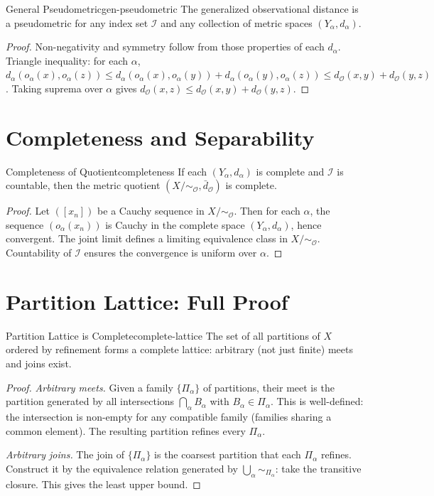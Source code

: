 \documentclass[12pt,twoside,openright]{book}
\newcommand{\obs}{\mathcal{O}}
\newcommand{\distMetric}{d_{\mathcal{O}}}
\providecommand{\quotientObs}{X/{\sim_{\obs}}}
\begin{document}
\begin{theorem}{General Pseudometric}{gen-pseudometric}
The generalized observational distance is a pseudometric for
any index set $\mathcal{I}$ and any collection of metric
spaces $(Y_\alpha,d_\alpha)$.
\begin{proof}
Non-negativity and symmetry follow from those properties of
each $d_\alpha$. Triangle inequality: for each $\alpha$,
$d_\alpha(o_\alpha(x),o_\alpha(z))\le d_\alpha(o_\alpha(x),
o_\alpha(y))+d_\alpha(o_\alpha(y),o_\alpha(z))\le
\distMetric(x,y)+\distMetric(y,z)$. Taking suprema over
$\alpha$ gives $\distMetric(x,z)\le\distMetric(x,y)+
\distMetric(y,z)$.
\end{proof}
\end{theorem}

\section{Completeness and Separability}

\begin{theorem}{Completeness of Quotient}{completeness}
If each $(Y_\alpha,d_\alpha)$ is complete and $\mathcal{I}$
is countable, then the metric quotient $(\quotientObs,
\bar{d}_\obs)$ is complete.
\begin{proof}
Let $([x_n])$ be a Cauchy sequence in $\quotientObs$. Then
for each $\alpha$, the sequence $(o_\alpha(x_n))$ is Cauchy
in the complete space $(Y_\alpha,d_\alpha)$, hence convergent.
The joint limit defines a limiting equivalence class in
$\quotientObs$. Countability of $\mathcal{I}$ ensures the
convergence is uniform over $\alpha$.
\end{proof}
\end{theorem}

\section{Partition Lattice: Full Proof}

\begin{theorem}{Partition Lattice is Complete}{complete-lattice}
The set of all partitions of $X$ ordered by refinement forms
a complete lattice: arbitrary (not just finite) meets and joins
exist.
\begin{proof}
\emph{Arbitrary meets.} Given a family $\{\Pi_\alpha\}$ of
partitions, their meet is the partition generated by all
intersections $\bigcap_\alpha B_\alpha$ with $B_\alpha\in
\Pi_\alpha$. This is well-defined: the intersection is
non-empty for any compatible family (families sharing a
common element). The resulting partition refines every
$\Pi_\alpha$.

\emph{Arbitrary joins.} The join of $\{\Pi_\alpha\}$ is the
coarsest partition that each $\Pi_\alpha$ refines. Construct
it by the equivalence relation generated by $\bigcup_\alpha
\sim_{\Pi_\alpha}$: take the transitive closure.
This gives the least upper bound.
\end{proof}
\end{theorem}
\end{document}

